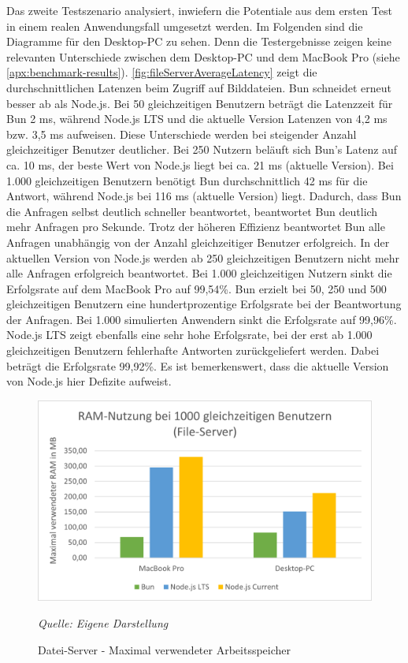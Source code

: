 \noindent
Das zweite Testszenario analysiert, inwiefern die Potentiale aus dem ersten Test in einem realen Anwendungsfall umgesetzt werden. Im Folgenden sind die Diagramme für den Desktop-PC zu sehen. Denn die Testergebnisse zeigen keine relevanten Unterschiede zwischen dem Desktop-PC und dem MacBook Pro (siehe \autoref{apx:benchmark-results}). \autoref{fig:fileServerAverageLatency} zeigt die durchschnittlichen Latenzen beim Zugriff auf Bilddateien. Bun schneidet erneut besser ab als Node.js. Bei 50 gleichzeitigen Benutzern beträgt die Latenzzeit für Bun 2 ms, während Node.js LTS und die aktuelle Version Latenzen von 4,2 ms bzw. 3,5 ms aufweisen. Diese Unterschiede werden bei steigender Anzahl gleichzeitiger Benutzer deutlicher. Bei 250 Nutzern beläuft sich Bun's Latenz auf ca. 10 ms, der beste Wert von Node.js liegt bei ca. 21 ms (aktuelle Version). Bei 1.000 gleichzeitigen Benutzern benötigt Bun durchschnittlich 42 ms für die Antwort, während Node.js bei 116 ms (aktuelle Version) liegt. Dadurch, dass Bun die Anfragen selbst deutlich schneller beantwortet, beantwortet Bun deutlich mehr Anfragen pro Sekunde. Trotz der höheren Effizienz beantwortet Bun alle Anfragen unabhängig von der Anzahl gleichzeitiger Benutzer erfolgreich. In der aktuellen Version von Node.js werden ab 250 gleichzeitigen Benutzern nicht mehr alle Anfragen erfolgreich beantwortet. Bei 1.000 gleichzeitigen Nutzern sinkt die Erfolgsrate auf dem MacBook Pro auf 99,54\%. Bun erzielt bei 50, 250 und 500 gleichzeitigen Benutzern eine hundertprozentige Erfolgsrate bei der Beantwortung der Anfragen. Bei 1.000 simulierten Anwendern sinkt die Erfolgsrate auf 99,96\%. Node.js LTS zeigt ebenfalls eine sehr hohe Erfolgsrate, bei der erst ab 1.000 gleichzeitigen Benutzern fehlerhafte Antworten zurückgeliefert werden. Dabei beträgt die Erfolgsrate 99,92\%. Es ist bemerkenswert, dass die aktuelle Version von Node.js hier Defizite aufweist.\\
\clearpage

\begin{figure}[h!]
	\centering
	\includegraphics[width=\linewidth]{./images/fileServerRamUsage.png}
	\caption{Datei-Server - Maximal verwendeter Arbeitsspeicher}
	\label{fig:fileServerRamUsage}
	\textit{Quelle: Eigene Darstellung}
\end{figure}


